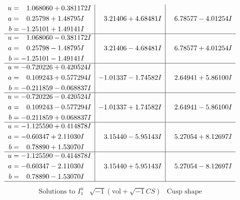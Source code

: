 \documentclass[1p]{elsarticle_modified}
\theoremstyle{definition}
\newcommand{\I}{\sqrt{-1}}
\begin{document}
$$\begin{array}{c|c|c}
\begin{aligned}
u &= \phantom{-}1.068060 + 0.381172 I \\
a &= \phantom{-}0.25798 + 1.48795 I \\
b &= -1.25101 + 1.49141 I\end{aligned}
 & \phantom{-}3.21406 + 4.68481 I & \phantom{-}6.78577 - 4.01254 I \\ \hline\begin{aligned}
u &= \phantom{-}1.068060 - 0.381172 I \\
a &= \phantom{-}0.25798 - 1.48795 I \\
b &= -1.25101 - 1.49141 I\end{aligned}
 & \phantom{-}3.21406 - 4.68481 I & \phantom{-}6.78577 + 4.01254 I \\ \hline\begin{aligned}
u &= -0.720226 + 0.420524 I \\
a &= \phantom{-}0.109243 + 0.577294 I \\
b &= -0.211859 - 0.068837 I\end{aligned}
 & -1.01337 - 1.74582 I & \phantom{-}2.64941 + 5.86100 I \\ \hline\begin{aligned}
u &= -0.720226 - 0.420524 I \\
a &= \phantom{-}0.109243 - 0.577294 I \\
b &= -0.211859 + 0.068837 I\end{aligned}
 & -1.01337 + 1.74582 I & \phantom{-}2.64941 - 5.86100 I \\ \hline\begin{aligned}
u &= -1.125590 + 0.414878 I \\
a &= -0.60347 + 2.11030 I \\
b &= \phantom{-}0.78890 + 1.53070 I\end{aligned}
 & \phantom{-}3.15440 - 5.95143 I & \phantom{-}5.27054 + 8.12697 I \\ \hline\begin{aligned}
u &= -1.125590 - 0.414878 I \\
a &= -0.60347 - 2.11030 I \\
b &= \phantom{-}0.78890 - 1.53070 I\end{aligned}
 & \phantom{-}3.15440 + 5.95143 I & \phantom{-}5.27054 - 8.12697 I\\
 \hline 
 \end{array}$$\newpage$$\begin{array}{c|c|c}  
\text{Solutions to }I^u_{1}& \I (\text{vol} + \sqrt{-1}CS) & \text{Cusp shape}\\

\end{array}$$
\end{document}
